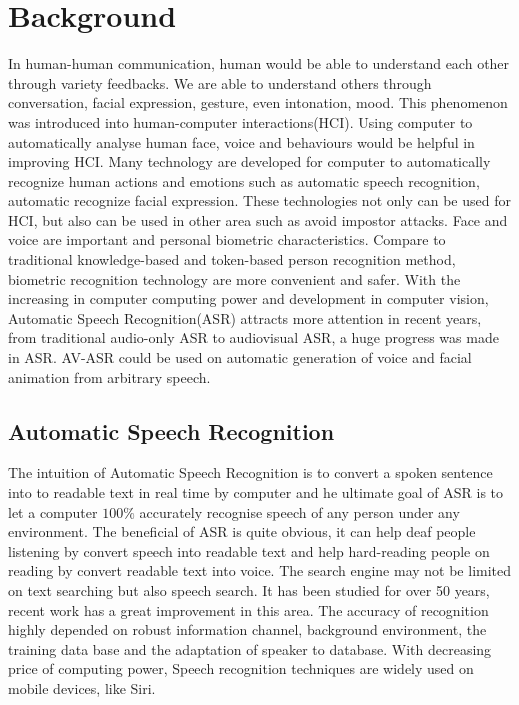 \chapter{Background}
In human-human communication, human would be able to understand each other through variety feedbacks. We are able to understand others through conversation, facial expression, gesture, even intonation, mood. This phenomenon was introduced into human-computer interactions(HCI). Using computer to automatically analyse human face, voice and behaviours would be helpful in improving HCI. Many technology are developed for computer to automatically recognize human actions and emotions such as automatic speech recognition\cite{potamianos2003recent}, automatic recognize facial expression\cite{xiong2013supervised}. These technologies not only can be used for HCI, but also can be used in other area such as avoid impostor attacks\cite{aleksic2006audio}. Face and voice are important and personal biometric characteristics. Compare to traditional knowledge-based and token-based person recognition method, biometric recognition technology are more convenient and safer. With the increasing in computer computing power and development in computer vision, Automatic Speech Recognition(ASR) attracts more attention in recent years, from traditional audio-only ASR to audiovisual ASR, a huge progress was made in ASR. AV-ASR could be used on automatic generation of voice and facial animation from arbitrary speech.

\section{Automatic Speech Recognition}
The intuition of Automatic Speech Recognition is to convert a spoken sentence into to readable text in real time by computer and he ultimate goal of ASR is to let a computer $100\%$ accurately recognise speech of any person under any environment. The beneficial of ASR is quite obvious, it can help deaf people listening by convert speech into readable text and help hard-reading people on reading by convert readable text into voice. The search engine may not be limited on text searching but also speech search. It has been studied for over 50 years, recent work has a great improvement in this area. The accuracy of recognition highly depended on robust information channel, background environment, the training data base and the adaptation of speaker to database. With decreasing price of computing power, Speech recognition techniques are widely used on mobile devices, like Siri.

